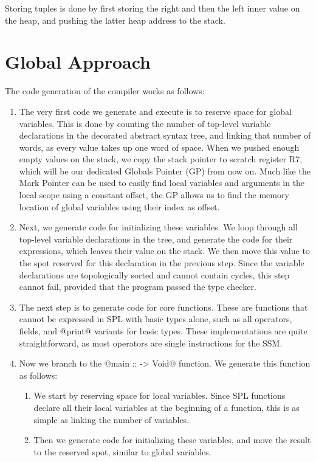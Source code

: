 Storing tuples is done by first storing the right and then the left inner value on the heap, and pushing the latter heap address to the stack.

\section{Global Approach}
The code generation of the compiler works as follows:
\begin{enumerate}
    \item The very first code we generate and execute is to reserve space for global variables. This is done by counting the number of top-level variable declarations in the decorated abstract syntax tree, and linking that number of words, as every value takes up one word of space. When we pushed enough empty values on the stack, we copy the stack pointer to scratch register R7, which will be our dedicated Globals Pointer (GP) from now on. Much like the Mark Pointer can be used to easily find local variables and arguments in the local scope using a constant offset, the GP allows us to find the memory location of global variables using their index as offset.
    \item Next, we generate code for initializing these variables. We loop through all top-level variable declarations in the tree, and generate the code for their expressions, which leaves their value on the stack. We then move this value to the spot reserved for this declaration in the previous step. Since the variable declarations are topologically sorted and cannot contain cycles, this step cannot fail, provided that the program passed the type checker.
    \item The next step is to generate code for core functions. These are functions that cannot be expressed in SPL with basic types alone, such as all operators, fields, and @print@ variants for basic types. These implementations are quite straightforward, as most operators are single instructions for the SSM.
    \item Now we branch to the @main :: -> Void@ function. We generate this function as follows:
    \begin{enumerate}
        \item We start by reserving space for local variables. Since SPL functions declare all their local variables at the beginning of a function, this is as simple as linking the number of variables.
        \item Then we generate code for initializing these variables, and move the result to the reserved spot, similar to global variables.

\end{enumerate}
\end{enumerate}
